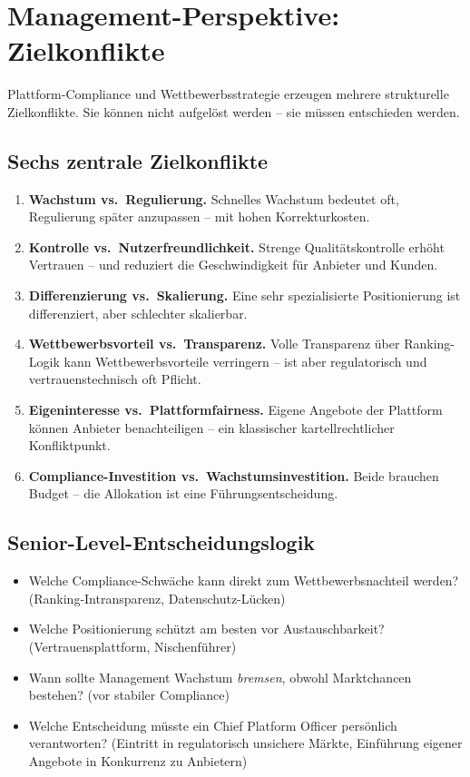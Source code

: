 \documentclass[11pt,a4paper,oneside]{article}
\begin{document}
\section{Management-Perspektive: Zielkonflikte}

Plattform-Compliance und Wettbewerbsstrategie erzeugen mehrere strukturelle Zielkonflikte. Sie können nicht aufgelöst werden -- sie müssen entschieden werden.

\subsection{Sechs zentrale Zielkonflikte}

\begin{enumerate}
  \item \textbf{Wachstum vs.\ Regulierung.} Schnelles Wachstum bedeutet oft, Regulierung später anzupassen -- mit hohen Korrekturkosten.
  \item \textbf{Kontrolle vs.\ Nutzerfreundlichkeit.} Strenge Qualitätskontrolle erhöht Vertrauen -- und reduziert die Geschwindigkeit für Anbieter und Kunden.
  \item \textbf{Differenzierung vs.\ Skalierung.} Eine sehr spezialisierte Positionierung ist differenziert, aber schlechter skalierbar.
  \item \textbf{Wettbewerbsvorteil vs.\ Transparenz.} Volle Transparenz über Ranking-Logik kann Wettbewerbsvorteile verringern -- ist aber regulatorisch und vertrauenstechnisch oft Pflicht.
  \item \textbf{Eigeninteresse vs.\ Plattformfairness.} Eigene Angebote der Plattform können Anbieter benachteiligen -- ein klassischer kartellrechtlicher Konfliktpunkt.
  \item \textbf{Compliance-Investition vs.\ Wachstumsinvestition.} Beide brauchen Budget -- die Allokation ist eine Führungsentscheidung.
\end{enumerate}

\subsection{Senior-Level-Entscheidungslogik}

\begin{itemize}
  \item Welche Compliance-Schwäche kann direkt zum Wettbewerbsnachteil werden? (Ranking-Intransparenz, Datenschutz-Lücken)
  \item Welche Positionierung schützt am besten vor Austauschbarkeit? (Vertrauensplattform, Nischenführer)
  \item Wann sollte Management Wachstum \emph{bremsen}, obwohl Marktchancen bestehen? (vor stabiler Compliance)
  \item Welche Entscheidung müsste ein Chief Platform Officer persönlich verantworten? (Eintritt in regulatorisch unsichere Märkte, Einführung eigener Angebote in Konkurrenz zu Anbietern)
\end{itemize}
\end{document}

